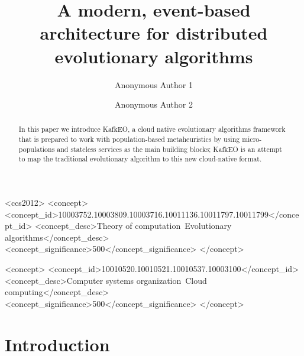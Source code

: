 \documentclass[sigconf]{acmart}
\begin{document}
\title{A modern, event-based architecture for distributed evolutionary algorithms}

\author{Anonymous Author 1}

\author{Anonymous Author 2}

\renewcommand{\shortauthors}{A. Author et al.}


\begin{abstract}
In this paper we introduce KafkEO, a cloud native evolutionary algorithms
framework that is prepared to work with population-based metaheuristics by using
micro-populations and stateless services as the main building
blocks; KafkEO is an attempt to map the traditional evolutionary
algorithm to this new cloud-native format.
\end{abstract}

\begin{CCSXML}
<ccs2012>
<concept>
<concept_id>10003752.10003809.10003716.10011136.10011797.10011799</concept_id>
<concept_desc>Theory of computation~Evolutionary algorithms</concept_desc>
<concept_significance>500</concept_significance>
</concept>

<concept>
<concept_id>10010520.10010521.10010537.10003100</concept_id>
<concept_desc>Computer systems organization~Cloud computing</concept_desc>
<concept_significance>500</concept_significance>
</concept>
\end{CCSXML}





\maketitle

\section{Introduction}
\end{document}
